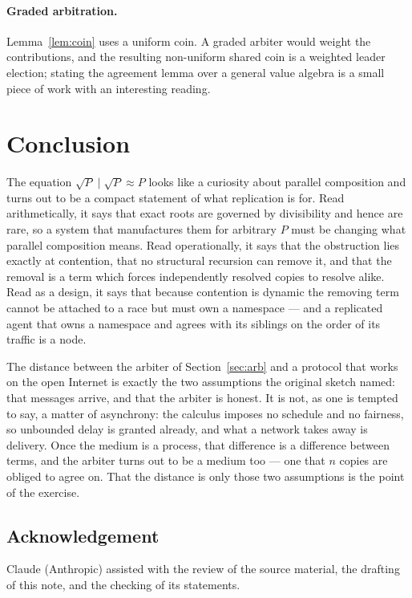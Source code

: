\documentclass[11pt]{article}
\theoremstyle{definition}
\newcommand{\rt}[1]{\sqrt{#1}}
\begin{document}
\paragraph{Graded arbitration.} Lemma~\ref{lem:coin} uses a uniform coin. A graded arbiter would weight the contributions, and the resulting non-uniform shared coin is a weighted leader election; stating the agreement lemma over a general value algebra is a small piece of work with an interesting reading.

\section{Conclusion}

The equation $\rt{P} \mid \rt{P} \approx P$ looks like a curiosity about parallel composition and turns out to be a compact statement of what replication is for. Read arithmetically, it says that exact roots are governed by divisibility and hence are rare, so a system that manufactures them for arbitrary $P$ must be changing what parallel composition means. Read operationally, it says that the obstruction lies exactly at contention, that no structural recursion can remove it, and that the removal is a term which forces independently resolved copies to resolve alike. Read as a design, it says that because contention is dynamic the removing term cannot be attached to a race but must own a namespace --- and a replicated agent that owns a namespace and agrees with its siblings on the order of its traffic is a node.

The distance between the arbiter of Section~\ref{sec:arb} and a protocol that works on the open Internet is exactly the two assumptions the original sketch named: that messages arrive, and that the arbiter is honest. It is not, as one is tempted to say, a matter of asynchrony: the calculus imposes no schedule and no fairness, so unbounded delay is granted already, and what a network takes away is delivery. Once the medium is a process, that difference is a difference between terms, and the arbiter turns out to be a medium too --- one that $n$ copies are obliged to agree on. That the distance is only those two assumptions is the point of the exercise.

\subsection*{Acknowledgement}

Claude (Anthropic) assisted with the review of the source material, the drafting of this note, and the checking of its statements.
\end{document}

